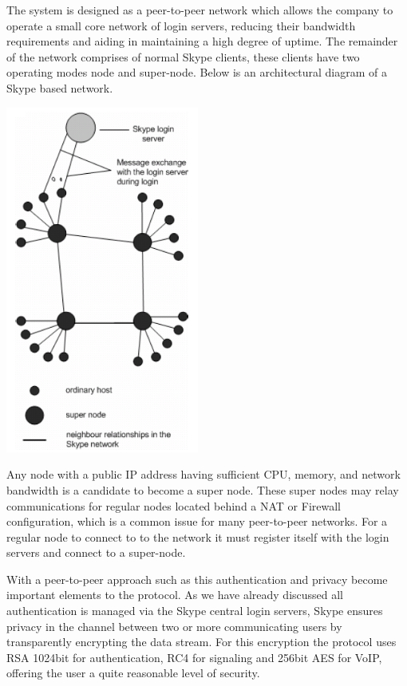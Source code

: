 The system is designed as a peer-to-peer network which allows the company to operate a small core network of login servers, reducing their bandwidth requirements and aiding in maintaining a high degree of uptime. The remainder of the network comprises of normal Skype clients, these clients have two operating modes node and super-node. Below is an architectural diagram of a Skype based network.

\begin{center}
	\includegraphics[width=2.5in]{images/Skype_network2.png}
\end{center}

Any node with a public IP address having sufficient CPU, memory, and network bandwidth is a candidate to become a super node\cite{website:BasetSchulzrinne}. These super nodes may relay communications for regular nodes located behind a NAT or Firewall configuration, which is a common issue for many peer-to-peer networks. For a regular node to connect to to the network it must register itself with the login servers and connect to a super-node.

With a peer-to-peer approach such as this authentication and privacy become important elements to the protocol. As we have already discussed all authentication is managed via the Skype central login servers, Skype ensures privacy in the channel between two or more communicating users by transparently encrypting the data stream. For this encryption the protocol uses RSA 1024bit for authentication, RC4 for signaling and 256bit AES for VoIP, offering the user a quite reasonable level of security\cite{website:Fabrice05}. 

